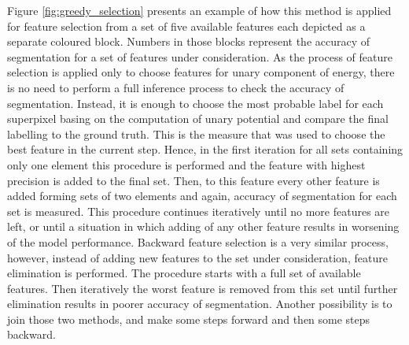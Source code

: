 Figure \ref{fig:greedy_selection} presents an example of how this method is applied for feature selection from a set of five available features each depicted as a separate coloured block. Numbers in those blocks represent the accuracy of segmentation for a set of features under consideration. As the process of feature selection is applied only to choose features for unary component of energy, there is no need to perform a full inference process to check the accuracy of segmentation. Instead, it is enough to choose the most probable label for each superpixel basing on the computation of unary potential and compare the final labelling to the ground truth. This is the measure that was used to choose the best feature in the current step. Hence, in the first iteration for all sets containing only one element this procedure is performed and the feature with highest precision is added to the final set. Then, to this feature every other feature is added forming sets of two elements and again, accuracy of segmentation for each set is measured. This procedure continues iteratively until no more features are left, or until a situation in which adding of any other feature results in worsening of the model performance. 
Backward feature selection is a very similar process, however, instead of adding new features to the set under consideration, feature elimination is performed. The procedure starts with a full set of available features. Then iteratively the worst feature is removed from this set until further elimination results in poorer accuracy of segmentation. Another possibility is to join those two methods, and make some steps forward and then some steps backward. 


